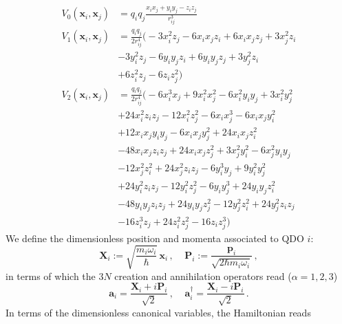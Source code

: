 \documentclass[reprint, amsmath, amssymb, aps]{revtex4-2}
\begin{document}
        \begin{align}
            V_0(\bm{x} _i, \bm{x} _j) &= q_iq_j\frac{x_ix_j + y_iy_j - z_iz_j}{r_{ij}^3}\\
            V_1(\bm{x} _i, \bm{x} _j) &= \frac{q_iq_j}{2r_{ij}^4}\big(-3  x_i ^2  z_j -6  x_i   x_j   z_i +6  x_i   x_j   z_j +3  x_j ^2  z_i\nonumber\\
            & -3  y_i ^2  z_j -6  y_i   y_j   z_i +6  y_i   y_j   z_j +3  y_j ^2  z_i\nonumber\\
            & +6  z_i ^2  z_j -6  z_i   z_j ^2\big)\\
            V_2(\bm{x} _i, \bm{x} _j) &= \frac{q_iq_j}{2 r_{ij}^4}\big(-6  x_i ^3  x_j +9  x_i ^2  x_j ^2-6  x_i ^2  y_i   y_j +3  x_i ^2  y_j ^2\nonumber\\
            &+24  x_i ^2  z_i   z_j -12  x_i ^2  z_j ^2-6  x_i   x_j ^3-6  x_i   x_j   y_i ^2\nonumber\\
            &+12  x_i   x_j   y_i   y_j -6  x_i   x_j   y_j ^2+24  x_i   x_j   z_i ^2\nonumber\\
            &-48  x_i   x_j   z_i   z_j +24  x_i   x_j   z_j ^2+3  x_j ^2  y_i ^2-6  x_j ^2  y_i   y_j \nonumber\\
            &-12  x_j ^2  z_i ^2+24  x_j ^2  z_i   z_j -6  y_i ^3  y_j +9  y_i ^2  y_j ^2\nonumber\\
            &+24  y_i ^2  z_i   z_j -12  y_i ^2  z_j ^2-6  y_i   y_j ^3+24  y_i   y_j   z_i ^2\nonumber\\
            &-48  y_i   y_j   z_i   z_j +24  y_i   y_j   z_j ^2-12  y_j ^2  z_i ^2+24  y_j ^2  z_i   z_j \nonumber\\
            &-16  z_i ^3  z_j +24  z_i ^2  z_j ^2-16  z_i   z_j ^3\big)
        \end{align}
        We define the dimensionless position and momenta associated to QDO $i$:
        \begin{equation}
            \bm{X}_i := \sqrt{\frac{m_i\omega_i}{\hbar}}\,\bm{x}_i\,,\ \ \ \ \ \bm{P}_i := \frac{\bm{p}_i}{\sqrt{2\hbar m_i\omega_i}}\,,
        \end{equation}
        in terms of which the $3N$ creation and annihilation operators read ($\alpha=1,2,3$)
        \begin{equation}
            \bm a_{i} = \frac{\bm X_{i} + i\bm P_{i}}{\sqrt 2}\,,\ \ \ \ \ \bm a^\dagger_{i} = \frac{\bm X_{i} - i\bm P_{i}}{\sqrt 2}\,.
        \end{equation}
        In terms of the dimensionless canonical variables, the Hamiltonian reads
\end{document}

